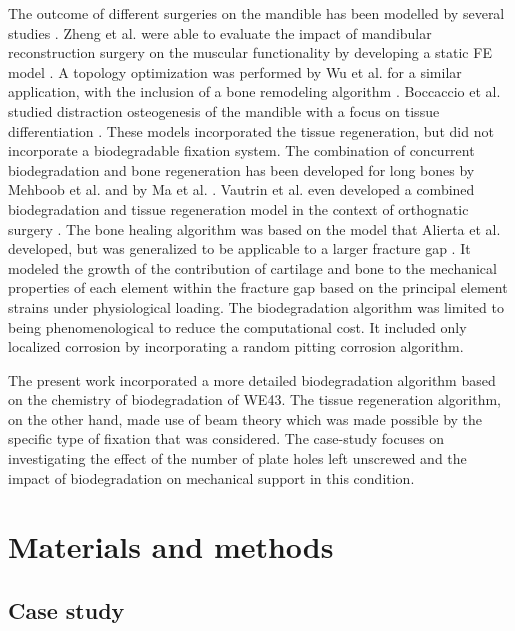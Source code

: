 The outcome of different surgeries on the mandible has been modelled by several studies \cite{Vautrin2021}. Zheng et al. were able to evaluate the impact of mandibular reconstruction surgery on the muscular functionality by developing a static FE model \cite{Zheng2019}. A topology optimization was performed by Wu et al. for a similar application, with the inclusion of a bone remodeling algorithm \cite{Wu2020}. Boccaccio et al. studied distraction osteogenesis of the mandible with a focus on tissue differentiation \cite{Boccaccio2008}. These models incorporated the tissue regeneration, but did not incorporate a biodegradable fixation system. The combination of concurrent biodegradation and bone regeneration has been developed for long bones by Mehboob et al. \cite{Mehboob2015} and by Ma et al. \cite{Ma2018}. Vautrin et al. even developed a combined biodegradation and tissue regeneration model in the context of orthognatic surgery \cite{Vautrin2021}. The bone healing algorithm was based on the model that Alierta et al. developed, but was generalized to be applicable to a larger fracture gap \cite{Alierta2013}. It modeled the growth of the contribution of cartilage and bone to the mechanical properties of each element within the fracture gap based on the principal element strains under physiological loading. The biodegradation algorithm was limited to being phenomenological to reduce the computational cost. It included only localized corrosion by incorporating a random pitting corrosion algorithm. 

The present work incorporated a more detailed biodegradation algorithm based on the chemistry of biodegradation of WE43. The tissue regeneration algorithm, on the other hand, made use of beam theory which was made possible by the specific type of fixation that was considered. The case-study focuses on investigating the effect of the number of plate holes left unscrewed and the impact of biodegradation on mechanical support in this condition.


\section{Materials and methods}

\subsection{Case study}

